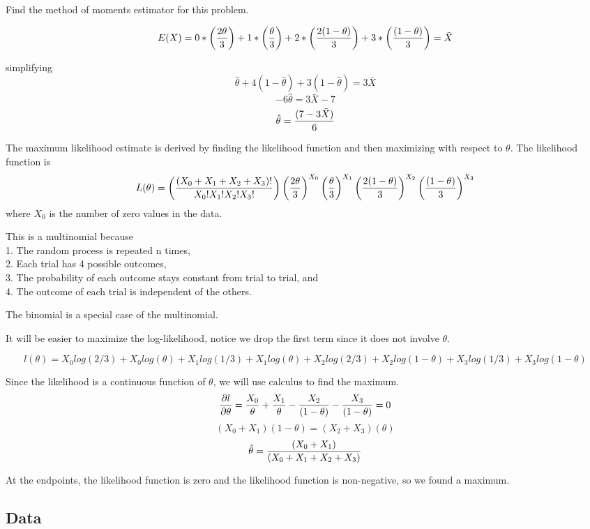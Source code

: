 \documentclass[]{book}
\theoremstyle{definition}
\theoremstyle{definition}
\theoremstyle{definition}
\theoremstyle{remark}
\begin{document}
Find the method of moments estimator for this problem.

\[E(X)=0*\left( {2 \theta \over 3} \right) +1*\left( { \theta \over 3} \right)+2*\left( {2 (1- \theta) \over 3} \right)+3*\left( {(1 - \theta ) \over 3} \right)=\bar{X}\]

simplifying
\[\hat{\theta} +4(1- \hat{\theta})+3(1- \hat{\theta})=3\bar{X}\]
\[-6\hat{\theta}=3\bar{X}-7\] \[\hat{\theta}={(7-3\bar{X}) \over 6}\]

The maximum likelihood estimate is derived by finding the likelihood
function and then maximizing with respect to \(\theta\). The likelihood
function is
\[L(\theta)= \left( {\left(X_{0}+X_{1}+X_{2}+X_{3} \right)! \over X_{0}!X_{1}!X_{2}!X_{3}!} \right) \left( {2 \theta \over 3} \right)^{X_{0}}\left( { \theta \over 3} \right)^{X_{1}}\left( {2 (1- \theta) \over 3} \right)^{X_{2}}\left( {(1 - \theta ) \over 3} \right)^{X_{3}}\]
where \(X_{0}\) is the number of zero values in the data.

This is a multinomial because\\
1. The random process is repeated n times,\\
2. Each trial has 4 possible outcomes,\\
3. The probability of each outcome stays constant from trial to trial,
and\\
4. The outcome of each trial is independent of the others.

The binomial is a special case of the multinomial.

It will be easier to maximize the log-likelihood, notice we drop the
first term since it does not involve \(\theta\).

\[l(\theta)=X_{0}log(2/3)+X_{0}log(\theta)+X_{1}log(1/3)+X_{1}log(\theta)+X_{2}log(2/3)+X_{2}log(1-\theta)+X_{3}log(1/3)+X_{3}log(1-\theta)\]

Since the likelihood is a continuous function of \(\theta\), we will use
calculus to find the maximum.
\[{\partial l \over \partial \theta} = {X_{0} \over \theta}+{X_{1} \over \theta}-{X_{2} \over (1- \theta)}-{X_{3} \over (1-\theta)}=0\]
\[(X_{0}+X_{1})(1-\theta)=(X_{2}+X_{3})(\theta)\]
\[\hat{\theta}={ (X_{0}+X_{1}) \over (X_{0}+X_{1}+X_{2}+X_{3}) }\]

At the endpoints, the likelihood function is zero and the likelihood
function is non-negative, so we found a maximum.

\subsection{Data}\label{data}
\end{document}
